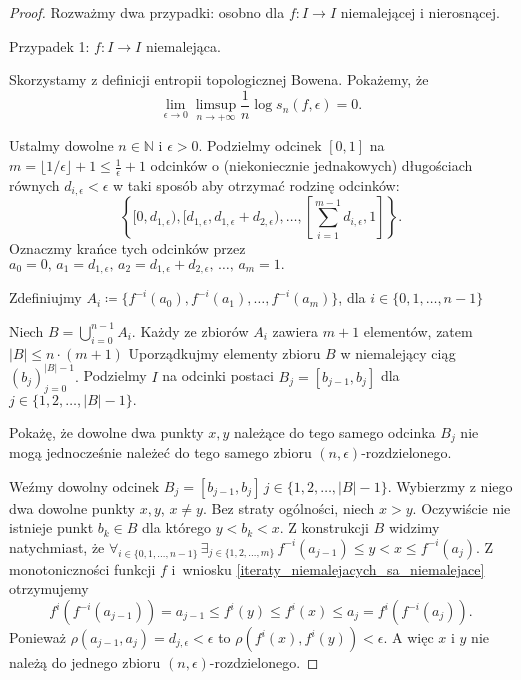 \documentclass[licencjacka]{pwr_wmat_praca_dyplomowa}
\theoremstyle{plain}
\numberwithin{theorem}{chapter}
\theoremstyle{definition}
\numberwithin{theorem}{chapter}
\begin{document}
\begin{proof}
Rozważmy dwa przypadki: osobno dla $f: I \rightarrow I$ niemalejącej i nierosnącej.
\item[Przypadek 1: $f: I \rightarrow I$ niemalejąca.]

Skorzystamy z definicji entropii topologicznej Bowena. Pokażemy, że 
$$\lim_{\epsilon \rightarrow 0} \limsup_{n \rightarrow +\infty} \frac{1}{n} \log s_n(f, \epsilon) = 0.$$


Ustalmy dowolne $n \in \mathbb{N}$ i $\epsilon > 0.$ Podzielmy odcinek $[0, 1]$ na $m = \lfloor 1/\epsilon \rfloor + 1 \leq \frac{1}{\epsilon} + 1$ odcinków o (niekoniecznie jednakowych) długościach równych $d_{i,\epsilon} < \epsilon$ w taki sposób aby otrzymać rodzinę odcinków: 
$$\left\{ [0, d_{1,\epsilon}), [d_{1,\epsilon}, d_{1,\epsilon} + d_{2, \epsilon}), \ldots, [\sum_{i=1}^{m-1} d_{i, \epsilon}, 1] \right\}.$$
Oznaczmy krańce tych odcinków przez $a_0=0, \, a_1 = d_{1,\epsilon}, \, a_2 = d_{1,\epsilon} + d_{2,\epsilon}, \, \ldots, \, a_m = 1.$ 

Zdefiniujmy $A_i \coloneqq \{f^{-i}(a_0), f^{-i}(a_1), \ldots, f^{-i}(a_m)\}$, dla $i \in \{0, 1, \ldots, n-1\}$

Niech $B = \bigcup_{i=0}^{n-1} A_i.$ Każdy ze zbiorów $A_i$ zawiera $m+1$ elementów, zatem $|B| \leq n \cdot (m+1)$ Uporządkujmy elementy zbioru $B$ w niemalejący ciąg $(b_j)_{j=0}^{|B|-1}.$ Podzielmy $I$ na odcinki postaci $B_j = [b_{j-1}, b_{j}]$ dla $j \in \{1, 2, \ldots, |B|-1\}.$  

Pokażę, że dowolne dwa punkty $x, y$ należące do tego samego odcinka $B_j$ nie mogą jednocześnie należeć do tego samego zbioru $(n, \epsilon)$-rozdzielonego.

Weźmy dowolny odcinek $B_j = [b_{j-1}, b_{j}] \, j \in \{1, 2, \ldots, |B|-1\}.$ Wybierzmy z niego dwa dowolne punkty $x, y$, $x \neq y$. Bez straty ogólności, niech $x > y.$ Oczywiście nie istnieje punkt $b_k \in B$ dla którego $y < b_k < x.$ Z konstrukcji $B$ widzimy natychmiast, że $\forall_{i \in \{0, 1, \ldots, n-1\}} \, \exists_{j \in \{1,2,\ldots,m\}} \, f^{-i}(a_{j-1}) \leq y < x \leq f^{-i}(a_j)$. Z monotoniczności funkcji $f$ i~wniosku \ref{iteraty_niemalejacych_sa_niemalejace} otrzymujemy 
$$f^i(f^{-i}(a_{j-1})) =  a_{j-1} \leq f^i(y) \leq f^i(x) \leq a_j = f^i(f^{-i}(a_j)).$$
Ponieważ $\rho(a_{j-1}, a_j) = d_{j,\epsilon} < \epsilon$ to  $\rho(f^i(x), f^i(y)) < \epsilon.$ A więc $x$ i $y$ nie należą do jednego zbioru $(n, \epsilon)$-rozdzielonego.




\end{proof}
\end{document}
